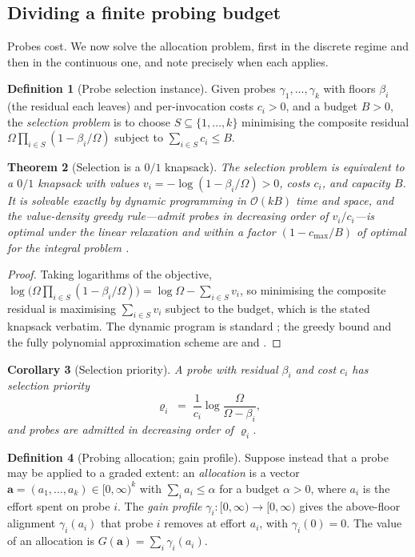\documentclass[11pt,twocolumn,a4paper]{article}
\theoremstyle{dirthm}
\newtheorem{theorem}{Theorem}[section]
\newtheorem{corollary}[theorem]{Corollary}
\theoremstyle{definition}
\newtheorem{definition}[theorem]{Definition}
\theoremstyle{remark}
\newcommand{\flo}{\beta}
\newcommand{\Om}{\Omega}
\newcommand{\att}{\alpha}
\newcommand{\alloc}{\mathbf{a}}
\newcommand{\gain}{\gamma}
\newcommand{\set}[1]{\{#1\}}
\begin{document}
\subsection{Dividing a finite probing budget}

Probes cost. We now solve the allocation problem, first in the discrete
regime and then in the continuous one, and note precisely when each applies.

\begin{definition}[Probe selection instance]
\label{def:selection}
Given probes $\gamma_1,\dots,\gamma_k$ with floors $\flo_i$ (the residual each
leaves) and per-invocation costs $c_i>0$, and a budget $B>0$, the
\emph{selection problem} is to choose $S\subseteq\set{1,\dots,k}$ minimising
the composite residual $\Om\prod_{i\in S}(1-\flo_i/\Om)$ subject to
$\sum_{i\in S}c_i\le B$.
\end{definition}

\begin{theorem}[Selection is a $0/1$ knapsack]
\label{thm:knapsack}
The selection problem is equivalent to a $0/1$ knapsack with values
$v_i=-\log(1-\flo_i/\Om)>0$, costs $c_i$, and capacity $B$. It is solvable
exactly by dynamic programming in $\mathcal{O}(kB)$ time and space, and the
value-density greedy rule---admit probes in decreasing order of $v_i/c_i$---is
optimal under the linear relaxation and within a factor
$(1-c_{\max}/B)$ of optimal for the integral problem
\citep{dantzig1957,kellerer2004,sahni1975}.
\end{theorem}

\begin{proof}
Taking logarithms of the objective,
$\log\bigl(\Om\prod_{i\in S}(1-\flo_i/\Om)\bigr)=\log\Om-\sum_{i\in S}v_i$,
so minimising the composite residual is maximising $\sum_{i\in S}v_i$ subject
to the budget, which is the stated knapsack verbatim. The dynamic program is
standard \citep{cormen2009}; the greedy bound and the fully polynomial
approximation scheme are \citet{dantzig1957} and \citet{sahni1975}.
\end{proof}

\begin{corollary}[Selection priority]
\label{cor:priority}
A probe with residual $\flo_i$ and cost $c_i$ has selection priority
\[
\varrho_i\;=\;\frac{1}{c_i}\log\frac{\Om}{\Om-\flo_i},
\]
and probes are admitted in decreasing order of $\varrho_i$.
\end{corollary}

\begin{definition}[Probing allocation; gain profile]
\label{def:alloc}
Suppose instead that a probe may be applied to a graded extent: an
\emph{allocation} is a vector $\alloc=(a_1,\dots,a_k)\in[0,\infty)^k$ with
$\sum_i a_i\le\att$ for a budget $\att>0$, where $a_i$ is the effort spent on
probe $i$. The \emph{gain profile} $\gain_i\colon[0,\infty)\to[0,\infty)$
gives the above-floor alignment $\gain_i(a_i)$ that probe $i$ removes at
effort $a_i$, with $\gain_i(0)=0$. The value of an allocation is
$G(\alloc)=\sum_i\gain_i(a_i)$.
\end{definition}
\end{document}
